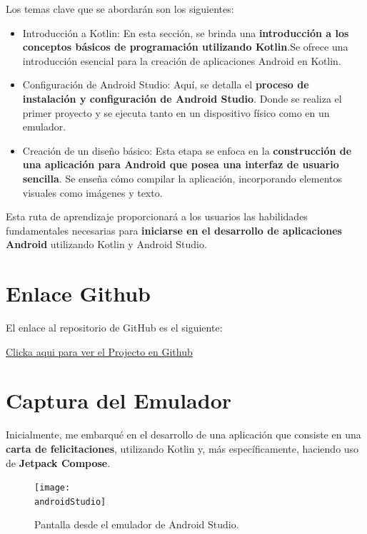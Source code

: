 \documentclass[a4paper]{article}
\newcommand{\androidStudio}{imagenes/android_studio.png}
\begin{document}
    Los temas clave que se abordarán son los siguientes:
    
    \begin{itemize}
    \item Introducción a Kotlin:
    En esta sección, se brinda una \textbf{introducción a los conceptos básicos de programación utilizando Kotlin}.Se ofrece una introducción esencial para la creación de aplicaciones Android en Kotlin.

    \item Configuración de Android Studio:
    Aquí, se detalla el \textbf{proceso de instalación y configuración de Android Studio}. Donde se realiza el primer proyecto y  se ejecuta tanto en un dispositivo físico como en un emulador.

    \item Creación de un diseño básico:
    Esta etapa se enfoca en la \textbf{construcción de una aplicación para Android que posea una interfaz de usuario sencilla}. Se enseña cómo compilar la aplicación, incorporando elementos visuales como imágenes y texto.

    \end{itemize}
    
    Esta ruta de aprendizaje proporcionará a los usuarios las habilidades fundamentales necesarias para \textbf{iniciarse en el desarrollo de aplicaciones Android} utilizando Kotlin y Android Studio.

    \section{Enlace Github}
    El enlace al repositorio de GitHub es el siguiente:\vspace{0.3cm}
    
    \href{https://github.com/AlejandroDavidArzolaSaavedra/Happy-Birthday-app}{Clicka aqui para ver el Projecto en Github}    
    
    \section{Captura del Emulador}
    Inicialmente, me embarqué en el desarrollo de una aplicación que consiste en una \textbf{carta de felicitaciones}, utilizando Kotlin y, más específicamente, haciendo uso de \textbf{Jetpack Compose}.

    \begin{figure}[h]
        \texttt{[image: \\androidStudio]}
        \caption{Pantalla desde el emulador de Android Studio.}
    \end{figure}
\end{document}
